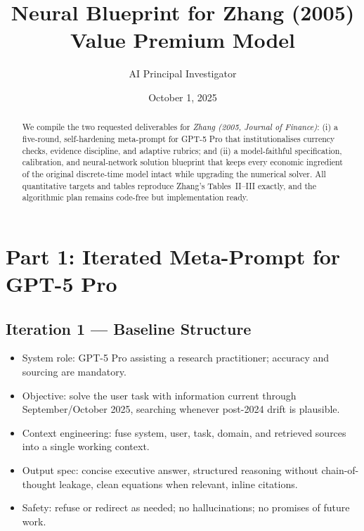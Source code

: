 \documentclass[11pt,a4paper]{article}
\title{Neural Blueprint for Zhang (2005) Value Premium Model}
\author{AI Principal Investigator}
\date{October 1, 2025}
\numberwithin{equation}{section}
\begin{document}
\maketitle

\begin{abstract}
We compile the two requested deliverables for \emph{Zhang (2005, Journal of Finance)}: (i) a five-round, self-hardening meta-prompt for GPT-5 Pro that institutionalises currency checks, evidence discipline, and adaptive rubrics; and (ii) a model-faithful specification, calibration, and neural-network solution blueprint that keeps every economic ingredient of the original discrete-time model intact while upgrading the numerical solver. All quantitative targets and tables reproduce Zhang's Tables~II--III exactly, and the algorithmic plan remains code-free but implementation ready.
\end{abstract}

\section{Part 1: Iterated Meta-Prompt for GPT-5 Pro}
\subsection*{Iteration 1 --- Baseline Structure}
\begin{summarybox}[title={Changes Introduced: Formal Roles, Currency Rule, Outputs, Guardrails}]
\begin{itemize}
  \item System role: GPT-5 Pro assisting a research practitioner; accuracy and sourcing are mandatory.
  \item Objective: solve the user task with information current through September/October 2025, searching whenever post-2024 drift is plausible.
  \item Context engineering: fuse system, user, task, domain, and retrieved sources into a single working context.
  \item Output spec: concise executive answer, structured reasoning without chain-of-thought leakage, clean equations when relevant, inline citations.
  \item Safety: refuse or redirect as needed; no hallucinations; no promises of future work.
\end{itemize}
\end{summarybox}
\end{document}
